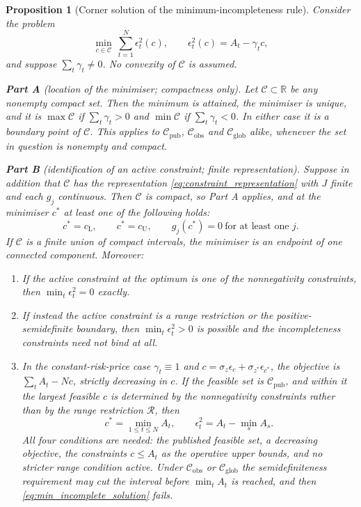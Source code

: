 \documentclass[11pt]{article}
\newtheorem{proposition}[proposition]{Proposition}
\theoremstyle{definition}
\newcommand{\R}{\mathbb{R}}
\begin{document}
\begin{proposition}[Corner solution of the minimum-incompleteness rule]\label{prop:min_incomplete}
Consider the problem
\begin{equation}\label{eq:min_incomplete_problem}
\min_{c\in\mathcal C}\ \sum_{t=1}^N\epsilon_t^2(c),
\qquad
\epsilon_t^2(c)=A_t-\gamma_tc,
\end{equation}
and suppose $\sum_t\gamma_t\ne0$. No convexity of $\mathcal C$ is assumed.

\textnormal{\textbf{Part A} (location of the minimiser; compactness only).} Let $\mathcal C\subset\R$ be any nonempty compact set. Then the minimum is attained, the minimiser is unique, and it is $\max\mathcal C$ if $\sum_t\gamma_t>0$ and $\min\mathcal C$ if $\sum_t\gamma_t<0$. In either case it is a boundary point of $\mathcal C$. This applies to $\mathcal C_{\text{pub}}$, $\mathcal C_{\text{obs}}$ and $\mathcal C_{\text{glob}}$ alike, whenever the set in question is nonempty and compact.

\textnormal{\textbf{Part B} (identification of an active constraint; finite representation).} Suppose in addition that $\mathcal C$ has the representation \eqref{eq:constraint_representation} with $J$ finite and each $g_j$ continuous. Then $\mathcal C$ is compact, so Part A applies, and at the minimiser $c^*$ at least one of the following holds:
\begin{equation}\label{eq:active_alternatives}
c^*=c_{\mathrm L},
\qquad
c^*=c_{\mathrm U},
\qquad
g_j(c^*)=0\ \text{for at least one }j .
\end{equation}
If $\mathcal C$ is a finite union of compact intervals, the minimiser is an endpoint of one connected component. Moreover:
\begin{enumerate}[label=(\roman*)]
\item If the active constraint at the optimum is one of the nonnegativity constraints, then $\min_t\epsilon_t^2=0$ exactly.
\item If instead the active constraint is a range restriction or the positive-semidefinite boundary, then $\min_t\epsilon_t^2>0$ is possible and the incompleteness constraints need not bind at all.
\item In the constant-risk-price case $\gamma_t\equiv1$ and $c=\sigma_z\epsilon_c+\sigma_{z^*}\epsilon_{c^*}$, the objective is $\sum_tA_t-Nc$, strictly decreasing in $c$. If the feasible set is $\mathcal C_{\text{pub}}$, and within it the largest feasible $c$ is determined by the nonnegativity constraints rather than by the range restriction $\mathcal R$, then
\begin{equation}\label{eq:min_incomplete_solution}
c^*=\min_{1\le t\le N}A_t,
\qquad
\epsilon_t^2=A_t-\min_sA_s .
\end{equation}
All four conditions are needed: the published feasible set, a decreasing objective, the constraints $c\le A_t$ as the operative upper bounds, and no stricter range condition active. Under $\mathcal C_{\text{obs}}$ or $\mathcal C_{\text{glob}}$ the semidefiniteness requirement may cut the interval before $\min_tA_t$ is reached, and then \eqref{eq:min_incomplete_solution} fails.
\end{enumerate}
\end{proposition}
\end{document}
